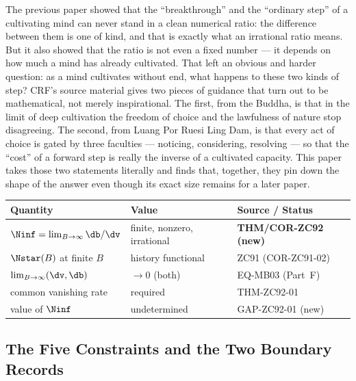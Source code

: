 \documentclass[12pt, a4paper]{article}
\begin{document}
The previous paper showed that the ``breakthrough'' and the ``ordinary
step'' of a cultivating mind can never stand in a clean numerical ratio:
the difference between them is one of kind, and that is exactly what an
irrational ratio means. But it also showed that the ratio is not even a
fixed number --- it depends on how much a mind has already cultivated.
That left an obvious and harder question: as a mind cultivates without
end, what happens to these two kinds of step? CRF's source material gives
two pieces of guidance that turn out to be mathematical, not merely
inspirational. The first, from the Buddha, is that in the limit of deep
cultivation the freedom of choice and the lawfulness of nature stop
disagreeing. The second, from Luang Por Ruesi Ling Dam, is that every act
of choice is gated by three faculties --- noticing, considering, resolving
--- so that the ``cost'' of a forward step is really the inverse of a
cultivated capacity. This paper takes those two statements literally and
finds that, together, they pin down the shape of the answer even though
its exact size remains for a later paper.

\begin{keybox}[title={Numerical Summary --- ZC92 (T-canonical)}]
{\footnotesize\renewcommand{\arraystretch}{1.3}
\begin{center}
\begin{tabular}{@{}p{5.6cm}p{3.0cm}p{3.6cm}@{}}
\toprule
\textbf{Quantity} & \textbf{Value} & \textbf{Source / Status} \\
\midrule
$\Ninf=\lim_{B\to\infty}\db/\dv$
  & finite, nonzero, irrational
  & \textbf{THM/COR-ZC92 (new)} \\
$\Nstar(B)$ at finite $B$
  & history functional
  & ZC91 (COR-ZC91-02) \\
$\lim_{B\to\infty}(\dv,\db)$
  & $\to 0$ (both)
  & EQ-MB03 (Part~F) \\
common vanishing rate
  & required
  & THM-ZC92-01 \\
value of $\Ninf$
  & undetermined
  & GAP-ZC92-01 (new) \\
\bottomrule
\end{tabular}
\end{center}}
\end{keybox}

\subsection{The Five Constraints and the Two Boundary Records}
\end{document}
